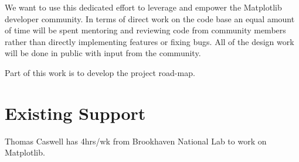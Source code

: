 \documentclass[11pt]{article}  %
\begin{document}
We want to use this dedicated effort to leverage and empower the
Matplotlib developer community.  In terms of direct work on the code
base an equal amount of time will be spent mentoring and reviewing
code from community members rather than directly implementing features
or fixing bugs.  All of the design work will be done in public with
input from the community.

Part of this work is to develop the project road-map.


\section{Existing Support}

Thomas Caswell has 4hrs/wk from Brookhaven National Lab to work on
Matplotlib.


\clearpage

\end{document}

